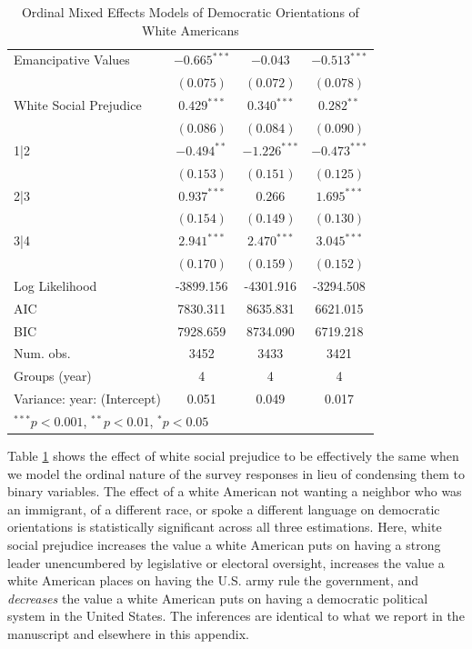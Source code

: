 \documentclass[11pt,]{article}
\begin{document}
\begin{table}
\begin{center}
\begin{tabular}{l c c c }
Emancipative Values         & $-0.665^{***}$ & $-0.043$       & $-0.513^{***}$ \\
                            & $(0.075)$      & $(0.072)$      & $(0.078)$      \\
White Social Prejudice      & $0.429^{***}$  & $0.340^{***}$  & $0.282^{**}$   \\
                            & $(0.086)$      & $(0.084)$      & $(0.090)$      \\
1|2                         & $-0.494^{**}$  & $-1.226^{***}$ & $-0.473^{***}$ \\
                            & $(0.153)$      & $(0.151)$      & $(0.125)$      \\
2|3                         & $0.937^{***}$  & $0.266$        & $1.695^{***}$  \\
                            & $(0.154)$      & $(0.149)$      & $(0.130)$      \\
3|4                         & $2.941^{***}$  & $2.470^{***}$  & $3.045^{***}$  \\
                            & $(0.170)$      & $(0.159)$      & $(0.152)$      \\
\hline
Log Likelihood              & -3899.156      & -4301.916      & -3294.508      \\
AIC                         & 7830.311       & 8635.831       & 6621.015       \\
BIC                         & 7928.659       & 8734.090       & 6719.218       \\
Num. obs.                   & 3452           & 3433           & 3421           \\
Groups (year)               & 4              & 4              & 4              \\
Variance: year: (Intercept) & 0.051          & 0.049          & 0.017          \\
\hline
\multicolumn{4}{l}{\scriptsize{$^{***}p<0.001$, $^{**}p<0.01$, $^*p<0.05$}}
\end{tabular}
\caption{Ordinal Mixed Effects Models of Democratic Orientations of White Americans}
\label{tab:ordinaltab}
\end{center}
\end{table}

Table \ref{tab:ordinaltab} shows the effect of white social prejudice to
be effectively the same when we model the ordinal nature of the survey
responses in lieu of condensing them to binary variables. The effect of
a white American not wanting a neighbor who was an immigrant, of a
different race, or spoke a different language on democratic orientations
is statistically significant across all three estimations. Here, white
social prejudice increases the value a white American puts on having a
strong leader unencumbered by legislative or electoral oversight,
increases the value a white American places on having the U.S. army rule
the government, and \emph{decreases} the value a white American puts on
having a democratic political system in the United States. The
inferences are identical to what we report in the manuscript and
elsewhere in this appendix.
\end{document}
